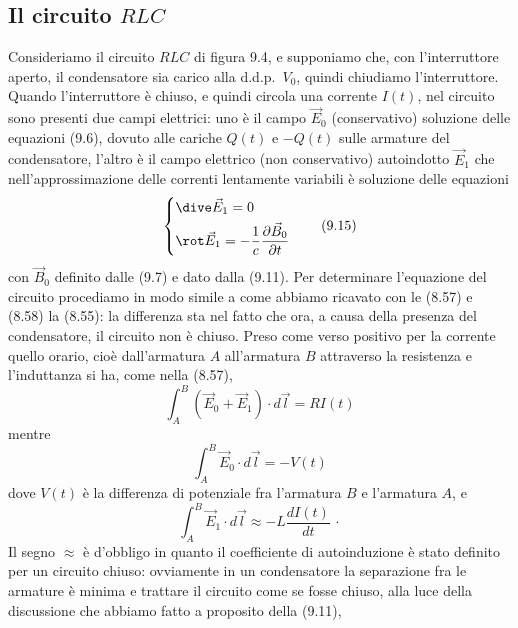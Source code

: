\subsection{Il circuito $RLC$}

Consideriamo il circuito $RLC$ di figura 9.4, e supponiamo che, con
l'interruttore aperto, il condensatore sia carico alla d.d.p.\ $V_0$, quindi
chiudiamo l'interruttore. Quando l'interruttore \`e chiuso, e quindi circola una
corrente $I(t)$, nel circuito sono presenti due campi elettrici: uno \`e il
campo $\vec E_0$ (conservativo) soluzione delle equazioni (9.6), dovuto alle
cariche $Q(t)$ e $-Q(t)$ sulle armature del condensatore, l'altro \`e il campo
elettrico (non conservativo) autoindotto $\vec E_1$ che nell'approssimazione
delle correnti lentamente variabili \`e soluzione delle equazioni
\begin{equation}
  \left\{\begin{aligned}
    &\dive\vec E_1=0\\
    &\rot\vec E_1=-\frac{1}{c}\frac{\partial\vec B_0}{\partial t}
  \end{aligned}\right.
  \tag{9.15}
\end{equation}
con $\vec B_0$ definito dalle (9.7) e dato dalla (9.11). Per determinare
l'equazione del circuito procediamo in modo simile a come abbiamo ricavato con
le (8.57) e (8.58) la (8.55): la differenza sta nel fatto che ora, a causa della
presenza del condensatore, il circuito non \`e chiuso. Preso come verso positivo
per la corrente quello orario, cio\`e dall'armatura $A$ all'armatura $B$
attraverso la resistenza e l'induttanza si ha, come nella (8.57),
\begin{equation}
  \int_A^B(\vec E_0+\vec E_1)\cdot d\vec l=RI(t)
  \tag{9.16}
\end{equation}
mentre
\begin{equation}
  \int_A^B\vec E_0\cdot d\vec l=-V(t)
  \tag{9.17}
\end{equation}
dove $V(t)$ \`e la differenza di potenziale fra l'armatura $B$ e l'armatura $A$,
e
\begin{equation}
  \int_A^B\vec E_1\cdot d\vec l\approx-L\frac{dI(t)}{dt}\,\cdot
  \tag{9.18}
\end{equation}
Il segno $\approx$ \`e d'obbligo in quanto il coefficiente di autoinduzione \`e
stato definito per un circuito chiuso: ovviamente in un condensatore la
separazione fra le armature \`e minima e trattare il circuito come se fosse
chiuso, alla luce della discussione che abbiamo fatto a proposito della (9.11),
